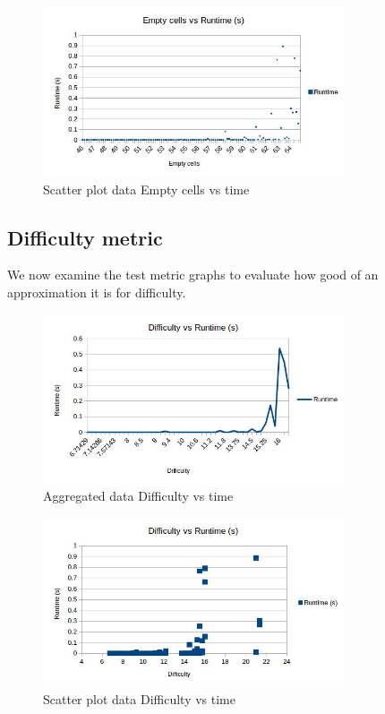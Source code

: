 \documentclass{article}
\begin{document}
\begin{figure}[H]
	\includegraphics[width=0.9\linewidth, height=5cm]{graphs_outputs/EmptycellsVSTimeScatter.jpg}
	\caption{Scatter plot data Empty cells vs time}
\end{figure}

\newpage

\subsection{Difficulty metric}
We now examine the test metric graphs to evaluate how good of an approximation it is for difficulty.

\begin{figure}[H]
	\includegraphics[width=0.9\linewidth, height=5cm]{graphs_outputs/DifficultyVSTimeAggregated.jpg}
	\caption{Aggregated data Difficulty vs time}
\end{figure}


\begin{figure}[H]
	\includegraphics[width=0.9\linewidth, height=5cm]{graphs_outputs/DifficultyVSTimeScatter.jpg}
	\caption{Scatter plot data Difficulty vs time}
\end{figure}
\end{document}
